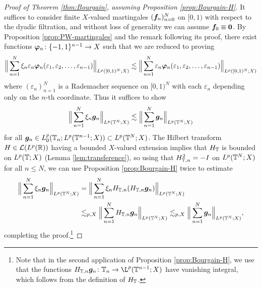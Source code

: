 \begin{proof}[Proof of Theorem \ref{thm:Bourgain}, assuming Proposition \ref{prop:Bourgain-H}]
  It suffices to consider finite $X$-valued martingales $(\bm{f}_n)_{n=0}^{N}$ on $[0,1)$ with respect to the dyadic filtration, and without loss of generality we can assume $\bm{f}_{0} \equiv \bm{0}$.
  By Proposition \ref{prop:PW-martingales} and the remark following its proof, there exist functions $\bm{\varphi}_{n} \colon \{-1,1\}^{n-1} \rightarrow X$ such that we are reduced to proving
  \begin{equation*}
    \Big\| \sum_{n=1}^{N} \xi_{n} \varepsilon_{n} \bm{\varphi}_{n}(\varepsilon_{1}, \varepsilon_{2}, \ldots, \varepsilon_{n-1}) \Big\|_{L^p([0,1)^{N};X)} \lesssim \Big\| \sum_{n=1}^{N} \varepsilon_{n} \bm{\varphi}_{n}(\varepsilon_{1}, \varepsilon_{2}, \ldots, \varepsilon_{n-1}) \Big\|_{L^p([0,1)^{N};X)}
  \end{equation*}
  where $(\varepsilon_{n})_{n=1}^{N}$ is a Rademacher sequence on $[0,1)^{N}$ with each $\varepsilon_{n}$ depending only on the $n$-th coordinate.
  Thus it suffices to show
  \begin{equation*}
    \Big\| \sum_{n=1}^{N} \xi_{n} \bm{g}_{n} \Big\|_{L^p(\mathbb{T}^{N};X)} \lesssim \Big\| \sum_{n=1}^{N} \bm{g}_{n} \Big\|_{L^p(\mathbb{T}^{N};X)}
  \end{equation*}
  for all $\bm{g}_{n} \in L_{0}^p(\mathbb{T}_{n};L^{p}(\mathbb{T}^{n-1};X)) \subset L^p(\mathbb{T}^{N};X)$.
  The Hilbert transform $H \in \mathcal{L}(L^p(\mathbb{R}))$ having a bounded $X$-valued extension implies that $H_{\mathbb{T}}$ is bounded on $L^p(\mathbb{T};X)$ (Lemma \ref{lem:transference}), so using that $H_{\mathbb{T},n}^{2} = -I$ on $L^p(\mathbb{T}^{N};X)$ for all $n \leq N$, we can use Proposition \ref{prop:Bourgain-H} twice to estimate
  \begin{equation*}
    \begin{aligned}
      \Big\| \sum_{n=1}^{N} \xi_{n} \bm{g}_{n} \Big\|_{L^p(\mathbb{T}^{N};X)}
      &= \Big\| \sum_{n=1}^{N} \xi_{n} H_{\mathbb{T},n} (H_{\mathbb{T},n} \bm{g}_{n}) \Big\|_{L^p(\mathbb{T}^{N};X)} \\
      &\lesssim_{p,X}  \Big\| \sum_{n=1}^{N} H_{\mathbb{T},n} \bm{g}_{n} \Big\|_{L^p(\mathbb{T}^{N};X)} 
      \lesssim_{p,X}  \Big\| \sum_{n=1}^{N} \bm{g}_{n} \Big\|_{L^p(\mathbb{T}^{N};X)},
    \end{aligned}
  \end{equation*}
  completing the proof.\footnote{Note that in the second application of Proposition \ref{prop:Bourgain-H}, we use that the functions $H_{\T,n} \mb{g}_{n} \colon \T_{n} \to \L^p(\T^{n-1};X)$ have vanishing integral, which follows from the definition of $H_{\mathbb{T}}$.}
\end{proof}

